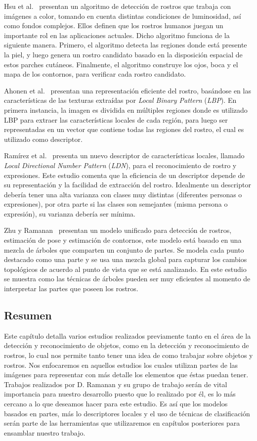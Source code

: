Hsu et al.~\cite{Hsu2002} presentan un algoritmo de detección de rostros que trabaja con imágenes a color, tomando en cuenta distintas condiciones de luminosidad, así como fondos complejos. Ellos definen que los rostros humanos juegan un importante rol en las aplicaciones actuales. Dicho algoritmo funciona de la siguiente manera. Primero, el algoritmo detecta las regiones donde está presente la piel, y luego genera un rostro candidato basado en la disposición espacial de estos parches cutáneos. Finalmente, el algoritmo construye los ojos, boca y el mapa de los contornos, para verificar cada rostro candidato.

Ahonen et al.~\cite{ahonen2006} presentan una representación eficiente del rostro, basándose en las características de las texturas extraídas por \textit{Local Binary Pattern} (\textit{LBP}). En primera instancia, la imagen es dividida en múltiples regiones donde es utilizado LBP para extraer las características locales de cada región, para luego ser representadas en un vector que contiene todas las regiones del rostro, el cual es utilizado como descriptor.

Ramírez et al.~\cite{ldnp2013} presenta un nuevo descriptor de características locales, llamado \textit{Local Directional Number Pattern} (\textit{LDN}), para el reconocimiento de rostro y expresiones. Este estudio comenta que la eficiencia de un descriptor depende de su representación y la facilidad de extracción del rostro. Idealmente un descriptor debería tener una alta varianza con clases muy distintas (diferentes personas o expresiones), por otra parte si las clases son semejantes (misma persona o expresión), su varianza debería ser mínima.

Zhu y Ramanan~\cite{Zhu2012} presentan un modelo unificado para detección de rostros, estimación de pose y estimación de contornos, este modelo está basado en una mezcla de árboles que comparten un conjunto de partes. Se modela cada punto destacado como una parte y se usa una mezcla global para capturar los cambios topológicos de acuerdo al punto de vista que se está analizando. En este estudio se muestra como las técnicas de árboles pueden ser muy eficientes al momento de interpretar las partes que poseen los rostros.

\subsection{Resumen}
Este capítulo detalla varios estudios realizados previamente tanto en el área de la detección y reconocimiento de objetos, como en la detección y reconocimiento de rostros, lo cual nos permite tanto tener una idea de como trabajar sobre objetos y rostros. Nos enfocaremos en aquellos estudios los cuales utilizan partes de las imágenes para representar con más detalle los elementos que éstas puedan tener. Trabajos realizados por D. Ramanan y su grupo de trabajo serán de vital importancia para nuestro desarrollo puesto que lo realizado por él, es lo más cercano a lo que deseamos hacer para este estudio. Es así que los modelos basados en partes, más lo descriptores locales y el uso de técnicas de clasificación serán parte de las herramientas que utilizaremos en capítulos posteriores para ensamblar nuestro trabajo.